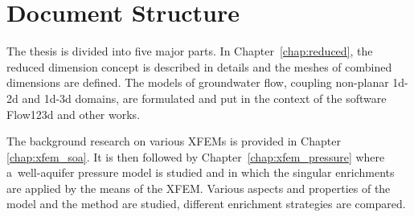 



\section{Document Structure} \label{sec:structure}

The thesis is divided into five major parts.
In Chapter~\ref{chap:reduced}, the reduced dimension concept is described in details and the meshes of combined dimensions are defined.
The models of groundwater flow, coupling non-planar 1d-2d and 1d-3d domains, are formulated and put in the context of the software Flow123d 
and other works.

The background research on various XFEMs is provided in Chapter \ref{chap:xfem_soa}.
It is then followed by Chapter~\ref{chap:xfem_pressure} where a~well-aquifer pressure model is studied and
in which the singular enrichments are applied by the means of the XFEM.
Various aspects and properties of the model and the method are studied, different enrichment strategies are compared. 

